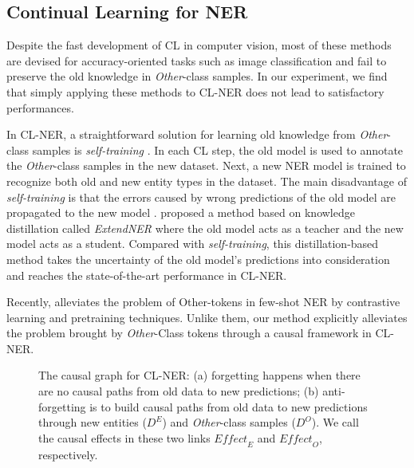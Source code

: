 \documentclass[11pt]{article}
\begin{document}
\subsection{Continual Learning for NER}
Despite the fast development of CL in computer vision, most of these methods \citep{douillard2020podnet,rebuffi2017icarl,hou2019learning} are devised for accuracy-oriented tasks such as image classification and fail to preserve the old knowledge in \textit{Other}-class samples.
In our experiment, we find that simply applying these methods to CL-NER does not lead to satisfactory performances.

In CL-NER, a straightforward solution for learning old knowledge from \textit{Other}-class samples is \textit{self-training} \citep{rosenberg2005semi,de2019continual}.
In each CL step, the old model is used to annotate the \textit{Other}-class samples in the new dataset.
Next, a new NER model is trained to recognize both old and new entity types in the dataset.
The main disadvantage of \textit{self-training} is that the errors caused by wrong predictions of the old model are propagated to the new model \citep{monaikul2021continual}.
\citet{monaikul2021continual} proposed a method based on knowledge distillation \citep{hinton2015distilling} called \textit{ExtendNER} where the old model acts as a teacher and the new model acts as a student.
Compared with \textit{self-training}, this distillation-based method takes the uncertainty of the old model’s predictions into consideration and reaches the state-of-the-art performance in CL-NER. 

Recently, \citet{das-etal-2022-container} alleviates the problem of Other-tokens in few-shot NER by contrastive learning and pretraining techniques.
Unlike them, our method explicitly alleviates the problem brought by \textit{Other}-Class tokens through a causal framework in CL-NER. 


\begin{figure*}[!t]
    \centering
    \caption{The causal graph for CL-NER: (a) forgetting happens when there are no causal paths from old data to new predictions; (b) anti-forgetting is to build causal paths from old data to new predictions through new entities ($D^E$) and \textit{Other}-class samples ($D^O$). We call the causal effects in these two links $\textit{Effect}_E$ and $\textit{Effect}_O$, respectively.}
\end{figure*}
\end{document}
